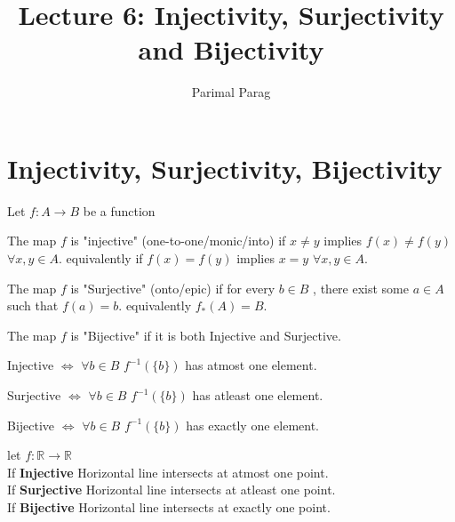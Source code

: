\documentclass[a4paper,english,12pt]{article}   	%
\title{Lecture 6: Injectivity, Surjectivity and Bijectivity}
\author{Parimal Parag}
\begin{document}
\maketitle

\section { Injectivity, Surjectivity, Bijectivity}
Let $ f \colon A \to B $ be a function
\begin{defn} [Injectivity] The map $f$ is "injective" (one-to-one/monic/into) if $x \neq y $ implies $f(x) \neq f(y) $  $\forall x,y \in A$.
equivalently if $f(x) = f(y) $ implies $x = y $ $\forall x,y \in A$.
\end{defn}
\begin{defn} [Surjectivity] The map $f$ is "Surjective" (onto/epic) if for every $b \in B$ , there exist some $a \in A $ such that $f(a)=b$. equivalently $f_{*}(A)=B$.
\end{defn}
\begin{defn} [Bijectivity] The map $f$ is "Bijective" if it is both Injective and Surjective.
\end{defn}
\begin{rem}
Injective $\Leftrightarrow$  $\forall b \in B$ $ f^{-1}(\{b\})$ has atmost one element.
\end{rem}
\begin{rem}
Surjective $\Leftrightarrow$  $\forall b \in B$ $ f^{-1}(\{b\})$ has atleast one element.
\end{rem}
\begin{rem}
Bijective $\Leftrightarrow$  $\forall b \in B$ $ f^{-1}(\{b\})$ has exactly one element.
\end{rem}
\begin{exmp}
let $f \colon \mathbb{R} \to \mathbb{R}$ \\
If \textbf{Injective} Horizontal line intersects at atmost one point.\\
If \textbf{Surjective} Horizontal line intersects at atleast one point.\\
If \textbf{Bijective} Horizontal line intersects at exactly one point.\\
\end{exmp}
\end{document}
